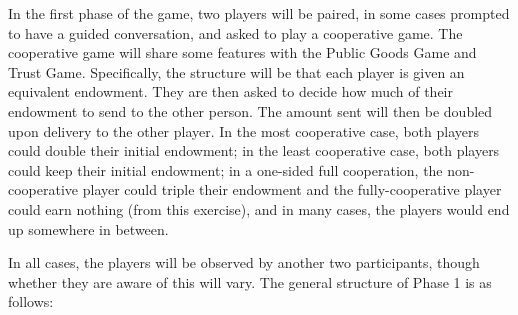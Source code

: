 \documentclass[10pt]{article}
\begin{document}
In the first phase of the game, two players will be paired, 
in some cases prompted to have a guided conversation, 
and asked to play a cooperative game. The cooperative game will 
share some features with the Public Goods Game and Trust Game. 
Specifically, the structure will be that each player is given an equivalent endowment.
They are then asked to decide how much of their endowment to send to the other person.
The amount sent will then be doubled upon delivery to the other player.
In the most cooperative case, both players could double their initial endowment;
in the least cooperative case, both players could keep their initial endowment;
in a one-sided full cooperation, the non-cooperative player could triple their 
endowment and the fully-cooperative player could earn nothing (from this 
exercise), and in many cases, the players would end up somewhere in between.

In all cases, the players will be observed by another two participants, though 
whether they are aware of this will vary. The general structure of Phase 1 
is as follows:
\end{document}
